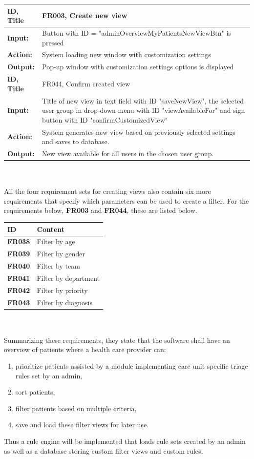 \documentclass{article}
\begin{document}
\begin{tabularx}{\linewidth}{| l |  X |}
\hline
\textbf{ID, Title} & FR003, Create new view \\ 
\hline
\textbf{Input:} & Button with ID = "adminOverviewMyPatientsNewViewBtn" is pressed \\
\textbf{Action:} & System loading new window with customization settings \\
\textbf{Output:} & Pop-up window with customization settings options is displayed \\
\hline

\textbf{ID, Title} & FR044, Confirm created view \\ 
\hline
\textbf{Input:} & Title of new view in text field with ID "saveNewView", the selected user group in drop-down menu with ID "viewAvailableFor" and sign button with ID "confirmCustomizedView" \\
\textbf{Action:} & System generates new view based on previously selected settings and saves to database. \\
\textbf{Output:} & New view available for all users in the chosen user group. \\
\hline
\end{tabularx}
\\ \\
All the four requirement sets for creating views also contain six more requirements that specify which parameters can be used to create a filter. For the requirements below, \textbf{FR003} and \textbf{FR044}, these are listed below.
\begin{table}[h]
\centering
\begin{tabular}{|l|l|}
\hline
ID & Content \\ \hline
\textbf{FR038} & Filter by age \\
\textbf{FR039} & Filter by gender \\
\textbf{FR040} & Filter by team \\
\textbf{FR041} & Filter by department \\
\textbf{FR042} & Filter by priority \\
\textbf{FR043} & Filter by diagnosis \\
\hline
\end{tabular}
\end{table}
\\ \\
Summarizing these requirements, they state that the software shall have an overview of patients where a health care provider can:
\begin{enumerate}[label=(\roman*)]
\item prioritize patients assisted by a module implementing care unit-specific triage rules set by an admin,
\item sort patients,
\item filter patients based on multiple criteria,
\item save and load these filter views for later use.
\end{enumerate}
Thus a rule engine will be implemented that loads rule sets created by an admin as well as a database storing custom filter views and custom rules.
\end{document}
